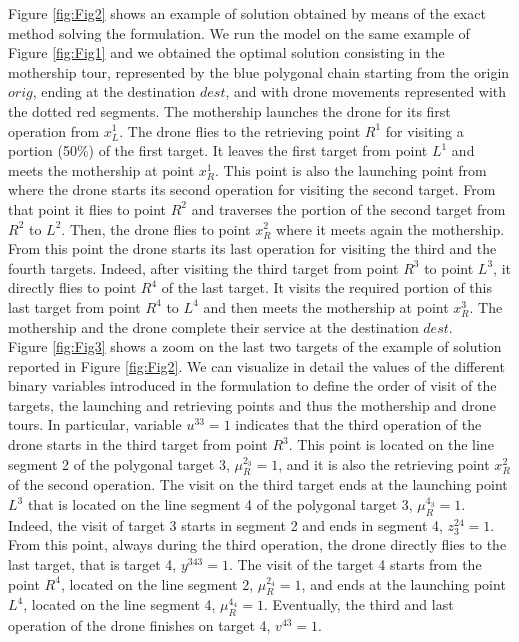 Figure \ref{fig:Fig2} shows an example of solution obtained by means of the exact method solving the formulation. We run the model on the same example of Figure \ref{fig:Fig1} and we obtained the optimal solution consisting in the mothership tour, represented by the blue polygonal chain starting from the origin $orig$, ending at the destination $dest$, and with drone movements represented with the dotted red segments. The mothership launches the drone for its first operation from $x_L^1$. The drone flies to the retrieving point $R^1$ for visiting a portion (50\%) of the first target. It leaves the first target from point $L^1$ and meets the mothership at point $x_R^1$. This point is also the launching point from where the drone starts its second operation for visiting the second target. From that point it flies to point $R^2$ and traverses the portion of the second target from $R^2$ to $L^2$. Then, the drone flies to point $x_R^2$ where it meets again the mothership. From this point the drone starts its last operation for visiting the third and the fourth targets. Indeed, after visiting the third target from point $R^3$ to point $L^3$, it directly flies to point $R^4$ of the last target. It visits the required portion of this last target from point $R^4$ to $L^4$ and then meets the mothership at point $x_R^3$. The mothership and the drone complete their service at the destination $dest$.\\
Figure \ref{fig:Fig3} shows a zoom on the last two targets of the example of solution reported in Figure \ref{fig:Fig2}. We can visualize in detail the values of the different binary variables introduced in the formulation to define the order of visit of the targets, the launching and retrieving points and thus the mothership and drone tours. In particular, variable $u^{33}=1$ indicates that the third operation of the drone starts in the third target from point $R^3$. This point is located on the line segment 2 of the polygonal target 3, $\mu_R^{2_3}=1$, and it is also the retrieving point $x_R^2$ of the second operation. The visit on the third target ends at the launching point $L^3$ that is located on the line segment 4 of the polygonal target 3, $\mu_R^{4_3}=1$. Indeed, the visit of target 3 starts in segment 2 and ends in segment 4, $z_3^{24}=1$. From this point, always during the third operation, the drone directly flies to the last target, that is target 4, $y^{343}=1$. The visit of the target 4 starts from the point $R^4$, located on the line segment 2, $\mu_R^{2_4}=1$, and ends at the launching point $L^4$, located on the line segment 4, $\mu_R^{4_4}=1$. Eventually, the third and last operation of the drone finishes on target 4, $v^{43}=1$.

